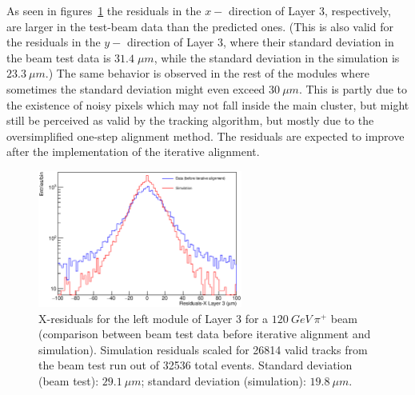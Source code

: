 \documentclass[a4paper,11pt]{article}
\begin{document}
As seen in figures~\ref{fig:6} the residuals in the $x-$ direction of Layer 3, respectively, are larger in the test-beam data than the predicted ones. (This is also valid for the residuals in the $y-$ direction of Layer 3, where their standard deviation in the beam test data is $31.4\; \mu m$, while the standard deviation in the simulation is $23.3\: \mu m$.) The same behavior is observed in the rest of the modules where sometimes the standard deviation might even exceed $30\: \mu m$. This is partly due to the existence of noisy pixels which may not fall inside the main cluster, but might still be perceived as valid by the tracking algorithm, but mostly due to the oversimplified one-step alignment method. The residuals are expected to improve after the implementation of the iterative alignment.

\begin{figure}[htbp]
	\centering %
	\includegraphics[width=0.6\textwidth,origin=c,angle=0]{Res_X_comparison_with_scale_log.eps}
	\caption{\label{fig:6} X-residuals for the left module of Layer 3 for a $120\: GeV\: \pi^{+}$ beam (comparison between beam test data before iterative alignment and simulation). Simulation residuals scaled for 26814 valid tracks from the beam test run out of 32536 total events. \newline Standard deviation (beam test): $29.1\: \mu m$; standard deviation (simulation): $19.8\: \mu m$.}
\end{figure}

\end{document}
